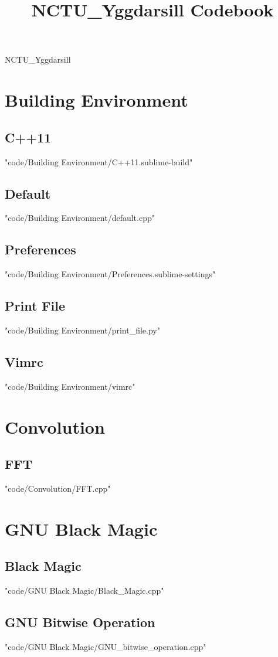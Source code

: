 \documentclass [landscape,8pt,a4paper,twocolumn]{article}
\title {NCTU\_Yggdarsill Codebook}
\begin{document}
\thispagestyle{fancy}
{ \Huge NCTU\_Yggdarsill}
\tableofcontents

\section{Building Environment}
\subsection{C++11}
 {"code/Building Environment/C++11.sublime-build"}
\subsection{Default}
 {"code/Building Environment/default.cpp"}
\subsection{Preferences}
 {"code/Building Environment/Preferences.sublime-settings"}
\subsection{Print File}
 {"code/Building Environment/print_file.py"}
\subsection{Vimrc}
 {"code/Building Environment/vimrc"}
\section{Convolution}
\subsection{FFT}
 {"code/Convolution/FFT.cpp"}
\section{GNU Black Magic}
\subsection{Black Magic}
 {"code/GNU Black Magic/Black_Magic.cpp"}
\subsection{GNU Bitwise Operation}
 {"code/GNU Black Magic/GNU_bitwise_operation.cpp"}
\end{document}
